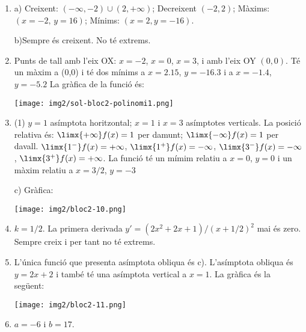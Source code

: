 \begin{enumerate}
	\item a) Creixent: $(-\infty, -2)\cup (2,+\infty)$;  Decreixent $(-2,2)$; Màxims: $(x=-2,\, y=16)$; Mínims: $(x=2, y=-16)$.
	
	b)Sempre és creixent. No té extrems.
	
	
	\item 
	\begin{minipage}{0.7\textwidth}
	 Punts de tall amb l'eix OX:  $x=-2$, $x=0$, $x=3$, i amb l'eix OY $(0,0)$. Té un màxim a (0,0) i té dos mínims a $x=2.15$, $y=-16.3$ i a $x=-1.4$, $y=-5.2$
	 La gràfica de la funció és:
	\end{minipage}
	\begin{minipage}{0.3\textwidth}
		\texttt{[image: img2/sol-bloc2-polinomi1.png]}
	\end{minipage}

	
	\item \begin{minipage}[t]{0.5\textwidth}
		\begin{tasks}(1)
				\task $y=1$ asímptota horitzontal; $x=1$ i $x=3$ asímptotes verticals. La posició relativa és: $\limx{+\infty} f(x)=1$ per damunt; 
				$\limx{-\infty} f(x)=1$ per davall. $\limx{1^-} f(x)=+\infty$, $\limx{1^+} f(x)=-\infty$, $\limx{3^-} f(x)=-\infty$, $\limx{3^+} f(x)=+\infty$.
				\task La funció té un mímim relatiu a $x=0$, $y=0$ i un màxim relatiu a $x=3/2$, $y=-3$
		\end{tasks}
	\end{minipage}
		\begin{minipage}[t]{0.5\textwidth}
		  \begin{center}
		c) Gràfica: 	
		
		\texttt{[image: img2/bloc2-10.png]}
		\end{center}
	\end{minipage}
	
	\item $k=1/2$. La primera derivada $y'=(2x^2+2x+1)/(x+1/2)^2$ mai és zero. Sempre creix i per tant no té extrems.
	
	
	\item \begin{minipage}[t]{0.5\textwidth}L'única funció que presenta asímptota obliqua és c). L'asímptota obliqua és $y=2x+2$ i també té una asímptota vertical a $x=1$. La gràfica és la següent:
		\end{minipage}
	\begin{minipage}[c]{0.5\textwidth}
	\begin{center}
	\texttt{[image: img2/bloc2-11.png]}
	\end{center}
	\end{minipage}

	\item $a=-6$ i $b=17$. 
	
\end{enumerate}



